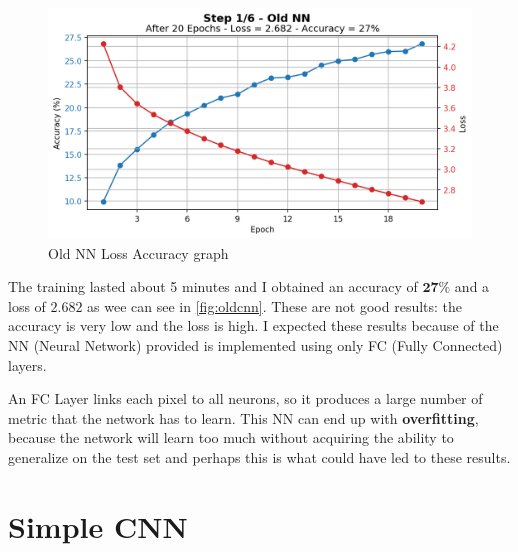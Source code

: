 \documentclass[a4paper, 11pt]{article}
\begin{document}
		\begin{figure}[ht!]
			\centering
			\includegraphics[width=0.65\paperwidth]{img/fig01.png}
			\caption{Old NN Loss Accuracy graph}
			\label{fig:oldcnn}
		\end{figure}
	
	The training lasted about 5 minutes and I obtained an accuracy of $\boldsymbol{27\%}$ and a loss of $2.682$ as wee can see in \vref{fig:oldcnn}. These are not good results: the accuracy is very low and the loss is high. I expected these results because of the NN (Neural Network) provided is implemented using only FC (Fully Connected) layers.
	
	An FC Layer links each pixel to all neurons, so it produces a large number of metric that the network has to learn. This NN can end up with \textbf{overfitting}, because the network will learn too much without acquiring the ability to generalize on the test set and perhaps this is what could have led to these results.
	
	\section{Simple CNN} \label{sect2}
	
\end{document}
